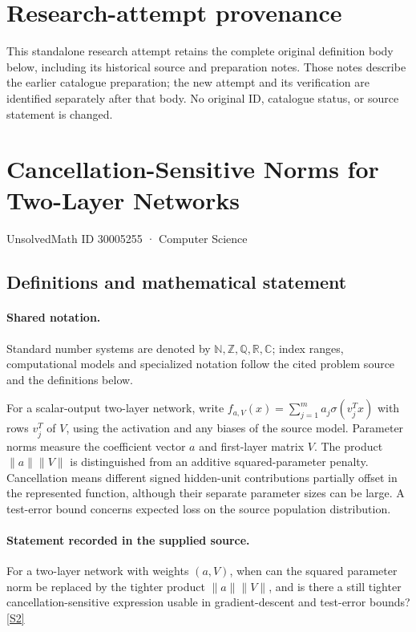 \documentclass[11pt]{article}
\begin{document}
\section*{Research-attempt provenance}
This standalone research attempt retains the complete original definition body below,
including its historical source and preparation notes. Those notes describe the
earlier catalogue preparation; the new attempt and its verification are identified
separately after that body. No original ID, catalogue status, or source statement is changed.

\section{Cancellation-Sensitive Norms for Two-Layer Networks}\label{30005255}
{\small UnsolvedMath ID 30005255 · Computer Science}
\subsection{Definitions and mathematical statement}

\paragraph{Shared notation.}Standard number systems are denoted by $\mathbb N,\mathbb Z,\mathbb Q,\mathbb R,\mathbb C$; index ranges, computational models and specialized notation follow the cited problem source and the definitions below.


For a scalar-output two-layer network, write $f_{a,V}(x)=\sum_{j=1}^m a_j\sigma(v_j^Tx)$ with rows $v_j^T$ of $V$, using the activation and any biases of the source model. Parameter norms measure the coefficient vector $a$ and first-layer matrix $V$. The product $\lVert a\rVert\lVert V\rVert$ is distinguished from an additive squared-parameter penalty. Cancellation means different signed hidden-unit contributions partially offset in the represented function, although their separate parameter sizes can be large. A test-error bound concerns expected loss on the source population distribution.
\paragraph{Statement recorded in the supplied source.}
For a two-layer network with weights $(a,V)$, when can the squared parameter norm be replaced by the tighter product $\lVert a\rVert\lVert V\rVert$, and is there a still tighter cancellation-sensitive expression usable in gradient-descent and test-error bounds? \href{https://doi.org/10.4171/owr/2022/46}{[S2]}
\end{document}
